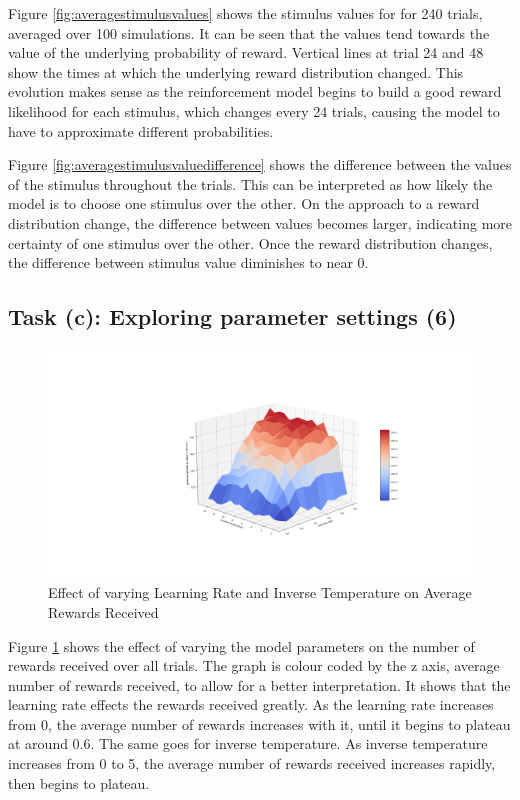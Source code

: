 \documentclass{article}
\begin{document}
Figure \ref{fig:averagestimulusvalues} shows the stimulus values for for 240 trials, averaged over 100 simulations. It can be seen that the values tend towards the value of the underlying probability of reward. Vertical lines at trial 24 and 48 show the times at which the underlying reward distribution changed. This evolution makes sense as the reinforcement model begins to build a good reward likelihood for each stimulus, which changes every 24 trials, causing the model to have to approximate different probabilities.

Figure \ref{fig:averagestimulusvaluedifference} shows the difference between the values of the stimulus throughout the trials. This can be interpreted as how likely the model is to choose one stimulus over the other. On the approach to a reward distribution change, the difference between values becomes larger, indicating more certainty of one stimulus over the other. Once the reward distribution changes, the difference between stimulus value diminishes to near 0.

\subsection{Task (c): Exploring parameter settings (6)}

\begin{figure}[H]
  \hspace*{-5cm}
  \includegraphics[width=1.4\textwidth]{figures/part2/task2/varying_parameters.png}
  \caption{Effect of varying Learning Rate and Inverse Temperature on Average Rewards Received}
  \label{fig:varyingparameters}
\end{figure}

Figure \ref{fig:varyingparameters} shows the effect of varying the model parameters on the number of rewards received over all trials. The graph is colour coded by the z axis, average number of rewards received, to allow for a better interpretation. It shows that the learning rate effects the rewards received greatly. As the learning rate increases from 0, the average number of rewards increases with it, until it begins to plateau at around 0.6. The same goes for inverse temperature. As inverse temperature increases from 0 to 5, the average number of rewards received increases rapidly, then begins to plateau.
\end{document}
